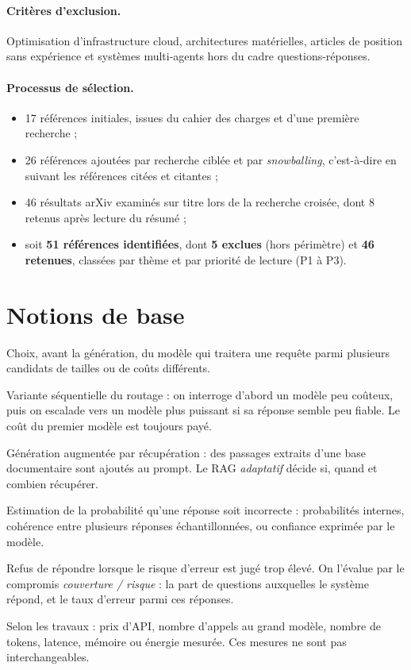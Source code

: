 \documentclass[11pt,a4paper]{article}
\begin{document}
\paragraph{Critères d'exclusion.} Optimisation d'infrastructure cloud, architectures matérielles,
articles de position sans expérience et systèmes multi-agents hors du cadre questions-réponses.

\paragraph{Processus de sélection.}
\begin{itemize}
\item 17 références initiales, issues du cahier des charges et d'une première recherche ;
\item 26 références ajoutées par recherche ciblée et par \textit{snowballing}, c'est-à-dire en
suivant les références citées et citantes ;
\item 46 résultats arXiv examinés sur titre lors de la recherche croisée, dont 8 retenus après lecture
du résumé ;
\item soit \textbf{51 références identifiées}, dont \textbf{5 exclues} (hors périmètre) et
\textbf{46 retenues}, classées par thème et par priorité de lecture (P1 à P3).
\end{itemize}

\section{Notions de base}\label{sec:notions}

\begin{description}[style=nextline,leftmargin=0.5cm]
\item[Routage (\textit{routing})] Choix, avant la génération, du modèle qui traitera une requête parmi
plusieurs candidats de tailles ou de coûts différents.
\item[Cascade] Variante séquentielle du routage : on interroge d'abord un modèle peu coûteux, puis on
escalade vers un modèle plus puissant si sa réponse semble peu fiable. Le coût du premier modèle est
toujours payé.
\item[RAG] Génération augmentée par récupération : des passages extraits d'une base documentaire sont
ajoutés au prompt. Le RAG \emph{adaptatif} décide si, quand et combien récupérer.
\item[Incertitude] Estimation de la probabilité qu'une réponse soit incorrecte : probabilités internes,
cohérence entre plusieurs réponses échantillonnées, ou confiance exprimée par le modèle.
\item[Abstention] Refus de répondre lorsque le risque d'erreur est jugé trop élevé. On l'évalue par le
compromis \emph{couverture / risque} : la part de questions auxquelles le système répond, et le taux
d'erreur parmi ces réponses.
\item[Coût] Selon les travaux : prix d'API, nombre d'appels au grand modèle, nombre de tokens, latence,
mémoire ou énergie mesurée. Ces mesures ne sont pas interchangeables.
\end{description}
\end{document}
